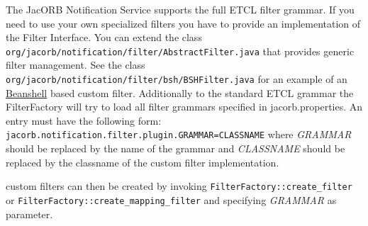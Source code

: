 The JacORB Notification Service supports the full ETCL filter grammar. If you need to use your own specialized filters you have to provide an implementation of the Filter Interface. You can extend the class
\texttt{org/jacorb/notification/filter/AbstractFilter.java} that provides generic filter management.
See the class \texttt{org/jacorb/notification/filter/bsh/BSHFilter.java} for an example of an \href{http://www.beanshell.org/}{Beanshell} based custom filter.
Additionally to the standard ETCL grammar the FilterFactory will try to
load all filter grammars specified in jacorb.properties.
An entry must have the following form:
\texttt{jacorb.notification.filter.plugin.GRAMMAR=CLASSNAME} where \emph{GRAMMAR} should be replaced by the name of the grammar and \emph{CLASSNAME} should be replaced by the classname of the custom filter implementation.

custom filters can then be created by invoking \texttt{FilterFactory::create\_filter} or \texttt{FilterFactory::create\_mapping\_filter} and specifying \emph{GRAMMAR} as parameter.



